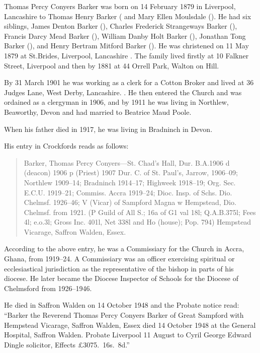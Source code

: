 
Thomas Percy Conyers Barker was born on 14 February 1879 in Liverpool, Lancashire to Thomas Henry Barker ( and Mary Ellen Moulsdale ().  He had six siblings, James Denton Barker (), Charles Frederick Strangeways Barker (),  Francis Darcy Mead Barker (), William Danby Holt Barker (),
Jonathan Tong Barker (), and Henry Bertram Mitford Barker ().
He was christened on 11 May 1879 at St.Brides, Liverpool, Lancashire  \cite{TPCBarkerBirth}. The family lived firstly at 10 Falkner Street, Liverpool  and then by 1881 at 44 Orrell Park, Walton on Hill. \cite{TPCBarkerResidence}

By 31 March 1901 he was working as a clerk for a Cotton Broker and lived at 36 Judges Lane, West Derby, Lancashire. \cite{TPCBarker1901}.  He then entered the Church and was ordained as a clergyman in 1906, and by 1911 he  was living in Northlew, Beaworthy, Devon  \cite{TPCBarker1911} and had married to Beatrice Maud Poole.

When his father died in 1917, he was living in Bradninch in Devon.\cite{THBdeathcert}

His entry in Crockfords reads as follows: \cite{TPCBarkerCrockfords}

\begin{quotation}
Barker, Thomas Percy Conyers---St. Chad's Hall, Dur. B.A.1906 d (deacon) 1906 p (Priest) 1907 Dur. C. of St. Paul's, Jarrow, 1906--09; Northlew 1909--14; Bradninch 1914--17; Highweek 1918--19; Org. Sec. E.C.U. 1919--21; Commiss. Accra 1919--24; Dioc. Insp. of Schs. Dio. Chelmsf. 1926--46; V (Vicar) of Sampford Magna w Hempstead, Dio. Chelmsf. from 1921. (P Guild of All S.; 16a of G1 val 18l; Q.A.B.375l; Fees 4l; e.o.3l; Gross Inc. 401l, Net 338l and Ho (house); Pop. 794) Hempstead Vicarage, Saffron Walden, Essex.
\end{quotation}

According to the above entry, he was a Commissiary for the Church in Accra, Ghana, from 1919--24.  A Commissiary was an officer exercising spiritual or ecclesiastical jurisdiction as the representative of the bishop in parts of his diocese.  He later became the Diocese Inspector of Schools for the Diocese of Chelmsford from 1926--1946.

He died in Saffron Walden on 14 October 1948 \cite{TPCBarkerDeath} and the Probate notice read: ``Barker the Reverend Thomas Percy Conyers Barker of Great Sampford with Hempstead Vicarage, Saffron Walden, Essex died 14 October 1948 at the General Hospital, Saffron Walden. Probate Liverpool 11 August to Cyril George Edward Dingle solicitor, Effects \pounds 3075.~16s.~8d.''
